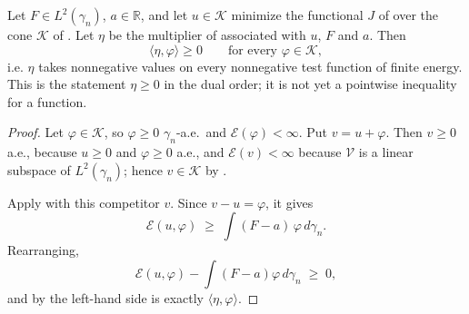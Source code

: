 \begin{lemma}
Let $F \in L^2(\gamma_n)$, $a \in \mathbb{R}$, and let $u \in \mathcal{K}$ minimize
the functional $J$ of  over the cone $\mathcal{K}$ of
.  Let $\eta$ be the multiplier of
 associated with $u$, $F$ and $a$.  Then
\[
  \langle \eta, \varphi\rangle \geq 0
  \qquad\text{for every } \varphi \in \mathcal{K},
\]
i.e. $\eta$ takes nonnegative values on every nonnegative test function of finite
energy.  This is the statement $\eta \geq 0$ in the dual order; it is not yet a
pointwise inequality for a function.
\end{lemma}
\begin{proof}
Let $\varphi \in \mathcal{K}$, so $\varphi \geq 0$ $\gamma_n$-a.e.\ and
$\mathcal{E}(\varphi) < \infty$.  Put $v = u + \varphi$.  Then $v \geq 0$ a.e.,
because $u \geq 0$ and $\varphi \geq 0$ a.e., and $\mathcal{E}(v) < \infty$
because $\mathcal{V}$ is a linear subspace of $L^2(\gamma_n)$; hence
$v \in \mathcal{K}$ by .

Apply  with this competitor $v$.  Since
$v - u = \varphi$, it gives
\[
  \mathcal{E}(u, \varphi) \;\geq\; \int (F-a)\,\varphi \, d\gamma_n .
\]
Rearranging,
\[
  \mathcal{E}(u,\varphi) - \int (F-a)\varphi\, d\gamma_n \;\geq\; 0 ,
\]
and by  the left-hand side is exactly
$\langle\eta,\varphi\rangle$.
\end{proof}
